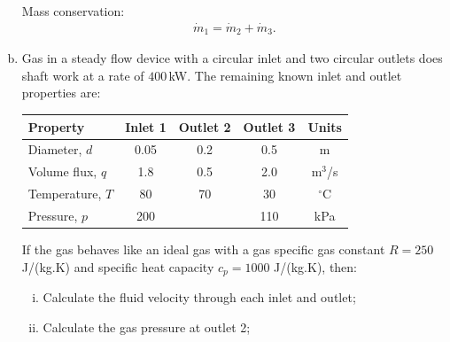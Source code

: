 \documentclass[calculator,steamtables,refrigeranttables,psychrometricchart,datasheet,solutions]{exam}
\begin{document}
\begin{question}
\begin{enumerate}[(a)]
{Mass conservation:
\begin{align*}
 \dot{m}_1 = \dot{m}_2 + \dot{m}_3.
\end{align*}
}

\item Gas in a steady flow device with a circular inlet and two circular outlets does shaft work at a rate of $400$\,kW. The remaining known inlet and outlet properties are: 
\begin{center}
\begin{tabular}{|l |c |c |c |c |}
\hline
Property            & Inlet 1 & Outlet 2 & Outlet 3 & Units       \\
\hline
Diameter, $d$       & 0.05    & 0.2      & 0.5      & m           \\
Volume flux, $q$    & 1.8     & 0.5      & 2.0      & m$^{3}$/s   \\
Temperature, $T$    & 80      & 70       & 30       & $^{\circ}$C \\
Pressure, $p$       & 200     &          & 110      & kPa         \\
\hline 
\end{tabular}
\end{center}
If the gas behaves like an ideal gas with a gas specific gas constant $R=250$\,J/(kg.K) and specific heat capacity $c_{p}=1000$ J/(kg.K), then:
\begin{enumerate}[(i)]
\item Calculate the fluid velocity through each inlet and outlet; 

\item Calculate the gas pressure at outlet 2; 
\end{enumerate}
\end{enumerate}
\end{question}
\end{document}
